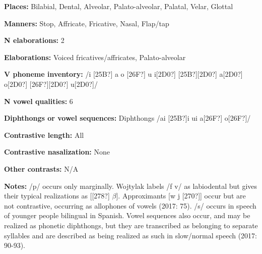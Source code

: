 \begin{styleBody}
\textbf{Places: }Bilabial, Dental, Alveolar, Palato-alveolar, Palatal, Velar, Glottal
\end{styleBody}

\begin{styleBody}
\textbf{Manners:} Stop, Affricate, Fricative, Nasal, Flap/tap
\end{styleBody}

\begin{styleBody}
\textbf{N elaborations:} 2
\end{styleBody}

\begin{styleBody}
\textbf{Elaborations:} Voiced fricatives/affricates, Palato-alveolar
\end{styleBody}

\begin{styleBody}
\textbf{V phoneme inventory:} /i [25B?] a o [26F?] u i[2D0?] [25B?][2D0?] a[2D0?] o[2D0?] [26F?][2D0?] u[2D0?]/
\end{styleBody}

\begin{styleBody}
\textbf{N vowel qualities:} 6
\end{styleBody}

\begin{styleBody}
\textbf{Diphthongs or vowel sequences:} Diphthongs /ai [25B?]i ui a[26F?] o[26F?]/
\end{styleBody}

\begin{styleBody}
\textbf{Contrastive length:} All
\end{styleBody}

\begin{styleBody}
\textbf{Contrastive nasalization:} None
\end{styleBody}

\begin{styleBody}
\textbf{Other contrasts:} N/A
\end{styleBody}

\begin{styleBody}
\textbf{Notes:} /p/ occurs only marginally. Wojtylak labels /f v/ as labiodental but gives their typical realizations as [[278?] $\beta $]. Approximants [w j [270?]] occur but are not contrastive, occurring as allophones of vowels (2017: 75). /s/ occurs in speech of younger people bilingual in Spanish. Vowel sequences also occur, and may be realized as phonetic diphthongs, but they are transcribed as belonging to separate syllables and are described as being realized as such in slow/normal speech (2017: 90-93).
\end{styleBody}

